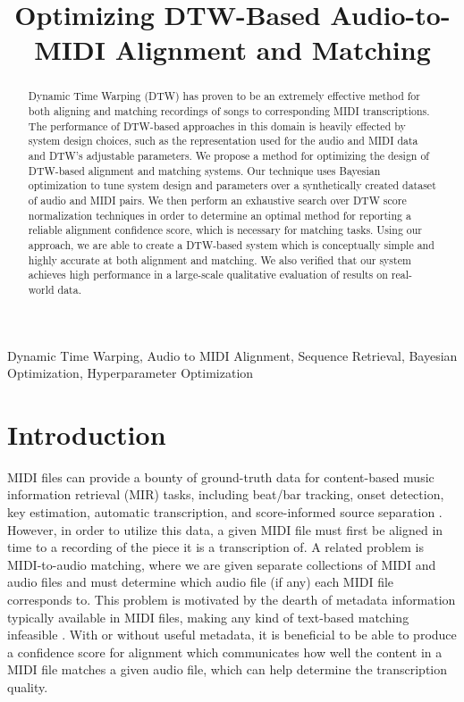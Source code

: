 \documentclass{article}
\title{Optimizing DTW-Based Audio-to-MIDI Alignment and Matching}
\begin{document}
\maketitle

\begin{abstract}
Dynamic Time Warping (DTW) has proven to be an extremely effective method for both aligning and matching recordings of songs to corresponding MIDI transcriptions.
The performance of DTW-based approaches in this domain is heavily effected by system design choices, such as the representation used for the audio and MIDI data and DTW's adjustable parameters.
We propose a method for optimizing the design of DTW-based alignment and matching systems.
Our technique uses Bayesian optimization to tune system design and parameters over a synthetically created dataset of audio and MIDI pairs.
We then perform an exhaustive search over DTW score normalization techniques in order to determine an optimal method for reporting a reliable alignment confidence score, which is necessary for matching tasks.
Using our approach, we are able to create a DTW-based system which is conceptually simple and highly accurate at both alignment and matching.
We also verified that our system achieves high performance in a large-scale qualitative evaluation of results on real-world data.
\end{abstract}

\begin{keywords}
Dynamic Time Warping, Audio to MIDI Alignment, Sequence Retrieval, Bayesian Optimization, Hyperparameter Optimization
\end{keywords}

\section{Introduction}
\label{sec:intro}

MIDI files can provide a bounty of ground-truth data for content-based music information retrieval (MIR) tasks, including beat/bar tracking, onset detection, key estimation, automatic transcription, and score-informed source separation \cite{ewert2012towards, turetsky2003ground, ewert2014score, raffel2014pretty_midi}.
However, in order to utilize this data, a given MIDI file must first be aligned in time to a recording of the piece it is a transcription of.
A related problem is MIDI-to-audio matching, where we are given separate collections of MIDI and audio files and must determine which audio file (if any) each MIDI file corresponds to.
This problem is motivated by the dearth of metadata information typically available in MIDI files, making any kind of text-based matching infeasible \cite{raffel2015large}.
With or without useful metadata, it is beneficial to be able to produce a confidence score for alignment which communicates how well the content in a MIDI file matches a given audio file, which can help determine the transcription quality.
\end{document}
